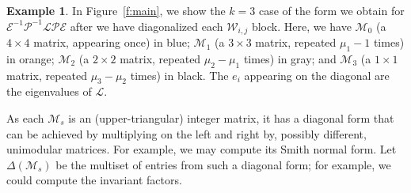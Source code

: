 \documentclass[11pt]{article}
\theoremstyle{definition}
\newtheorem{example}[theo]{Example}
\numberwithin{equation}{section}
\numberwithin{equation}{section}
\renewcommand{\L}{\mathcal{L}}
\renewcommand{\P}{\mathcal{P}}
\newcommand{\M}{\mathcal{M}}
\newcommand{\E}{\mathcal{E}}
\newcommand{\W}{\mathcal{W}}
\begin{document}
\begin{example}
In Figure~\ref{f:main}, we show the $k=3$ case of the form we obtain for $\E^{-1} \P^{-1} \L \P \E$ after we have diagonalized each $\W_{i,j}$ block.  Here, we have $\M_0$ (a $4 \times 4$ matrix, appearing once) in blue; $\M_1$ (a $3 \times 3$ matrix, repeated $\mu_1 - 1$ times) in orange; $\M_2$ (a $2 \times 2$ matrix, repeated $\mu_2 - \mu_1$ times) in gray; and $\M_3$ (a $1 \times 1$ matrix, repeated $\mu_3 - \mu_2$ times) in black.  The $e_i$ appearing on the diagonal are the eigenvalues of $\L$.
\end{example}

As each $\M_s$ is an (upper-triangular) integer matrix, it has a diagonal form that can be achieved by multiplying on the left and right by, possibly different, unimodular matrices.  For example, we may compute its Smith normal form.  Let $\Delta(\M_s)$ be the multiset of entries from such a diagonal form; for example, we could compute the invariant factors.
\end{document}
